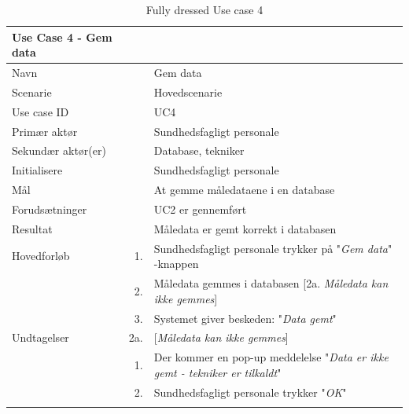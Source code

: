 
\begin{longtabu} to 
\toprule
    {\large \textbf{Use Case 4 - Gem data}} && \\
    \toprule
    Navn &&    Gem data\\
    Scenarie &&    Hovedscenarie\\
    Use case ID &&    UC4\\
    Primær aktør &&    Sundhedsfagligt personale\\
    Sekundær aktør(er) &&    Database, tekniker\\
    Initialisere &&    Sundhedsfagligt personale\\
    Mål &&    At gemme måledataene i en database\\
    Forudsætninger &&    UC2 er gennemført\\
    Resultat &&    Måledata er gemt korrekt i databasen\\
    \toprule
    Hovedforløb &    1. &    Sundhedsfagligt personale trykker på "\textit{Gem data}"\- -knappen\\[-1ex]
                &    2. &    Måledata gemmes i databasen\newline
                             [2a. \textit{Måledata kan ikke gemmes}]\\[-1ex]
                &    3. &    Systemet giver beskeden: "\textit{Data gemt}"\\[-1ex]
                             \toprule
    Undtagelser &    2a. &    [\textit{Måledata kan ikke gemmes}]\\[-1ex]
    &	1.	&	Der kommer en pop-up meddelelse "\textit{Data er ikke gemt - tekniker er tilkaldt}"\\[-1ex]
    &	2.	&	Sundhedsfagligt personale trykker "\textit{OK}"\\[-1ex]
                \toprule
\caption{Fully dressed Use case 4}
\label{UC4}
\end{longtabu}
\newpage

